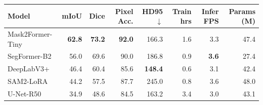 \begin{tabular}{lrrrrrrr}
\toprule
Model & mIoU & Dice & Pixel Acc. & HD95 $\downarrow$ & Train hrs & Infer FPS & Params (M) \\
\midrule
Mask2Former-Tiny & \textbf{62.8} & \textbf{73.2} & \textbf{92.0} & 166.3 & 1.6 & 3.3 & 47.4 \\
SegFormer-B2 & 56.0 & 69.6 & 90.0 & 186.8 & 0.9 & \textbf{3.6} & 27.4 \\
DeepLabV3+ & 46.4 & 60.4 & 85.6 & \textbf{148.4} & 0.6 & 3.1 & 42.4 \\
SAM2-LoRA & 44.2 & 57.5 & 87.7 & 245.0 & 0.8 & 3.6 & 48.0 \\
U-Net-R50 & 34.9 & 48.6 & 84.5 & 163.2 & 3.4 & 3.0 & 43.1 \\
\bottomrule
\end{tabular}

